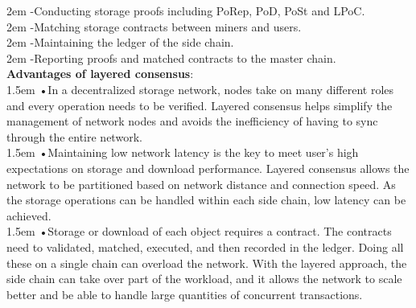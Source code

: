 \documentclass[10pt,a4paper]{article}
\begin{document}
\hangindent 2em
\noindent   
-\quad Conducting storage proofs including PoRep, PoD, PoSt and LPoC.
\vspace{-1em}
\\

\hangindent 2em
\noindent   
-\quad Matching storage contracts between miners and users.
\vspace{-1em}
\\

\hangindent 2em
\noindent   
-\quad Maintaining the ledger of the side chain.
\vspace{-1em}
\\

\hangindent 2em
\noindent   
-\quad Reporting proofs and matched contracts to the master chain.
\vspace{-0.8em}
\\

\noindent
{\bf Advantages of layered consensus}:
\vspace{-0.8em}
\\

\hangindent 1.5em
\noindent   
•\quad In a decentralized storage network, nodes take on many different roles and every operation needs to be verified. Layered consensus helps simplify the management of network nodes and avoids the inefficiency of having to sync through the entire network.
\vspace{-0.8em}
\\

\hangindent 1.5em
\noindent   
•\quad Maintaining low network latency is the key to meet user’s high expectations on storage and download performance. Layered consensus allows the network to be partitioned based on network distance and connection speed. As the storage operations can be handled within each side chain, low latency can be achieved.
\vspace{-0.8em}
\\

\hangindent 1.5em
\noindent   
•\quad Storage or download of each object requires a contract. The contracts need to validated, matched, executed, and then recorded in the ledger. Doing all these on a single chain can overload the network. With the layered approach, the side chain can take over part of the workload, and it allows the network to scale better and be able to handle large quantities of concurrent transactions.
\vspace{-0.5em}
\end{document}
